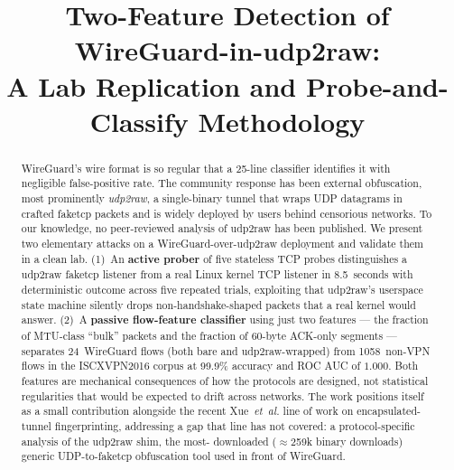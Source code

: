 \documentclass[conference]{IEEEtran}
\begin{document}
\title{Two-Feature Detection of WireGuard-in-udp2raw:\\
A Lab Replication and Probe-and-Classify Methodology}

\author{
\and
{}
}

\maketitle

\begin{abstract}
WireGuard's wire format is so regular that a 25-line classifier identifies it
with negligible false-positive rate. The community response has been
external obfuscation, most prominently \textit{udp2raw}, a single-binary
tunnel that wraps UDP datagrams in crafted faketcp packets and is widely
deployed by users behind censorious networks. To our knowledge, no
peer-reviewed analysis of udp2raw has been published. We present two
elementary attacks on a WireGuard-over-udp2raw deployment and validate them
in a clean lab. (1)~An \textbf{active prober} of five stateless TCP probes
distinguishes a udp2raw faketcp listener from a real Linux kernel TCP
listener in 8.5~seconds with deterministic outcome across five repeated
trials, exploiting that udp2raw's userspace state machine silently drops
non-handshake-shaped packets that a real kernel would answer.
(2)~A \textbf{passive flow-feature classifier} using just two features ---
the fraction of MTU-class ``bulk'' packets and the fraction of 60-byte
ACK-only segments --- separates 24~WireGuard flows (both bare and
udp2raw-wrapped) from 1058~non-VPN flows in the ISCXVPN2016 corpus at 99.9\%
accuracy and ROC AUC of $1.000$. Both features are mechanical consequences
of how the protocols are designed, not statistical regularities that would
be expected to drift across networks. The work positions itself as a small
contribution alongside the recent Xue~\textit{et~al.} line of work on
encapsulated-tunnel fingerprinting, addressing a gap that line has not
covered: a protocol-specific analysis of the udp2raw shim, the most-
downloaded ($\approx$259k binary downloads) generic UDP-to-faketcp
obfuscation tool used in front of WireGuard.
\end{abstract}
\end{document}
